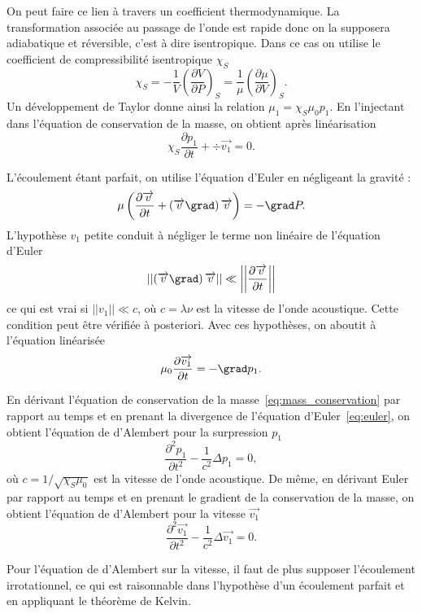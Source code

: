 On peut faire ce lien à travers un coefficient thermodynamique.
La transformation associée au passage de l'onde est rapide donc on la supposera adiabatique et réversible, c'est à dire isentropique.
Dans ce cas on utilise le coefficient de compressibilité isentropique $\chi_S$
\begin{equation*}
\chi_S = -\frac{1}{V} \left( \frac{\partial V}{\partial P} \right)_S = \frac{1}{\mu} \left( \frac{\partial \mu}{\partial V} \right)_S.
\end{equation*}
Un développement de Taylor donne ainsi la relation $\mu_1 = \chi_S\mu_0 p_1$.
En l'injectant dans l'équation de conservation de la masse, on obtient après linéarisation
\begin{equation}
\chi_S \frac{\partial p_1}{\partial t} + \div  \overrightarrow{v_1} = 0.
\label{eq:mass_conservation}
\end{equation}

L'écoulement étant parfait, on utilise l'équation d'Euler en négligeant la gravité :
\begin{equation*}
\mu \left( \frac{\partial \overrightarrow{v}}{\partial t} + \left( \overrightarrow{v}\grad\right)\overrightarrow{v}\right) = -\grad P.
\end{equation*}
L'hypothèse $v_1$ petite conduit à négliger le terme non linéaire de l'équation d'Euler
\begin{equation*}
\left|\left|\left( \overrightarrow{v}\grad\right)\overrightarrow{v}\right|\right| \ll \left|\left|\frac{\partial\overrightarrow{v}}{\partial t}\right|\right|
\end{equation*}
ce qui est vrai si $||v_1|| \ll c$, où $c=\lambda\nu$ est la vitesse de l'onde acoustique.
Cette condition peut être vérifiée à posteriori.
Avec ces hypothèses, on aboutit à l'équation linéarisée
\begin{equation}
\mu_0 \frac{\partial \overrightarrow{v_1}}{\partial t} = -\grad p_1.
\label{eq:euler}
\end{equation}

En dérivant l'équation de conservation de la masse~\ref{eq:mass_conservation} par rapport au temps et en prenant la divergence de l'équation d'Euler~\ref{eq:euler}, on obtient l'équation de d'Alembert pour la surpression $p_1$
\begin{equation}
\frac{\partial^2 p_1}{\partial t^2} - \frac{1}{c^2}\Delta p_1 = 0,
\label{eq:dalembert_p}
\end{equation}
où $c=1/\sqrt{\chi_S \mu_0}$ est la vitesse de l'onde acoustique.
De même, en dérivant Euler par rapport au temps et en prenant le gradient de la conservation de la masse, on obtient l'équation de d'Alembert pour la vitesse $\overrightarrow{v_1}$
\begin{equation}
\frac{\partial^2 \overrightarrow{v_1}}{\partial t^2} - \frac{1}{c^2}\Delta \overrightarrow{v_1} = 0.
\label{eq:dalembert_v}
\end{equation}
\begin{remarque}
Pour l'équation de d'Alembert sur la vitesse, il faut de plus supposer l'écoulement irrotationnel, ce qui est raisonnable dans l'hypothèse d'un écoulement parfait et en appliquant le théorème de Kelvin.
\end{remarque}

